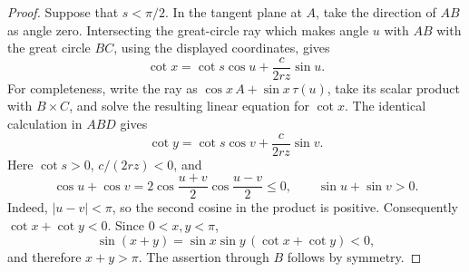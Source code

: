 \documentclass[10pt,a4paper]{amsart}
\begin{document}
\begin{proof}
Suppose that \(s<\pi/2\). In the tangent plane at \(A\), take the direction
of \(AB\) as angle zero. Intersecting the great-circle ray which makes angle
\(u\) with \(AB\) with the great circle \(BC\), using the displayed
coordinates, gives
\[
        \cot x=\cot s\cos u+\frac{c}{2rz}\sin u.
\]
For completeness, write the ray as
\(\cos x\,A+\sin x\,\tau(u)\), take its scalar product with \(B\times C\),
and solve the resulting linear equation for \(\cot x\).
The identical calculation in \(ABD\) gives
\[
        \cot y=\cot s\cos v+\frac{c}{2rz}\sin v.
\]
Here \(\cot s>0\), \(c/(2rz)<0\), and
\[
 \cos u+\cos v
 =2\cos\frac{u+v}{2}\cos\frac{u-v}{2}\le0,
 \qquad
 \sin u+\sin v>0.
\]
Indeed, \(|u-v|<\pi\), so the second cosine in the product is positive.
Consequently \(\cot x+\cot y<0\). Since \(0<x,y<\pi\),
\[
 \sin(x+y)=\sin x\sin y\,(\cot x+\cot y)<0,
\]
and therefore \(x+y>\pi\). The assertion through \(B\) follows by symmetry.
\end{proof}
\end{document}
